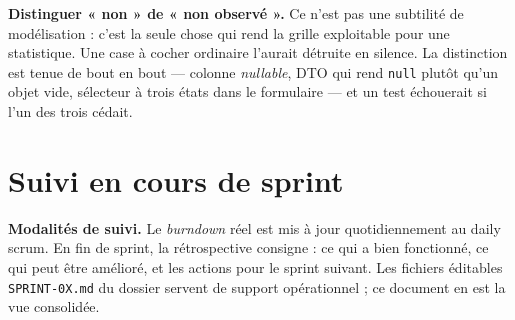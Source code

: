 \textbf{Distinguer « non » de « non observé ».} Ce n'est pas une subtilité de
modélisation : c'est la seule chose qui rend la grille exploitable pour une
statistique. Une case à cocher ordinaire l'aurait détruite en silence. La
distinction est tenue de bout en bout --- colonne \emph{nullable}, DTO qui rend
\texttt{null} plutôt qu'un objet vide, sélecteur à trois états dans le
formulaire --- et un test échouerait si l'un des trois cédait.

\section{Suivi en cours de sprint}

\begin{encadre}
\textbf{Modalités de suivi.} Le \emph{burndown} réel est mis à jour
quotidiennement au daily scrum. En fin de sprint, la rétrospective consigne :
ce qui a bien fonctionné, ce qui peut être amélioré, et les actions pour le
sprint suivant. Les fichiers éditables \texttt{SPRINT-0X.md} du dossier
 servent de support
opérationnel ; ce document en est la vue consolidée.
\end{encadre}
